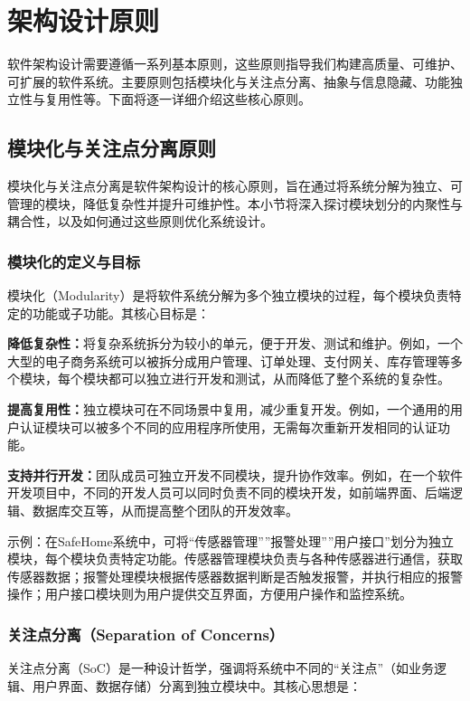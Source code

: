 \section{架构设计原则}

软件架构设计需要遵循一系列基本原则，这些原则指导我们构建高质量、可维护、可扩展的软件系统。主要原则包括模块化与关注点分离、抽象与信息隐藏、功能独立性与复用性等。下面将逐一详细介绍这些核心原则。

\subsection{模块化与关注点分离原则}

模块化与关注点分离是软件架构设计的核心原则，旨在通过将系统分解为独立、可管理的模块，降低复杂性并提升可维护性。本小节将深入探讨模块划分的内聚性与耦合性，以及如何通过这些原则优化系统设计。

\subsubsection{模块化的定义与目标}

模块化（Modularity）是将软件系统分解为多个独立模块的过程，每个模块负责特定的功能或子功能。其核心目标是：

\textbf{降低复杂性：}将复杂系统拆分为较小的单元，便于开发、测试和维护。例如，一个大型的电子商务系统可以被拆分成用户管理、订单处理、支付网关、库存管理等多个模块，每个模块都可以独立进行开发和测试，从而降低了整个系统的复杂性。

\textbf{提高复用性：}独立模块可在不同场景中复用，减少重复开发。例如，一个通用的用户认证模块可以被多个不同的应用程序所使用，无需每次重新开发相同的认证功能。

\textbf{支持并行开发：}团队成员可独立开发不同模块，提升协作效率。例如，在一个软件开发项目中，不同的开发人员可以同时负责不同的模块开发，如前端界面、后端逻辑、数据库交互等，从而提高整个团队的开发效率。

示例：在SafeHome系统中，可将``传感器管理''''报警处理''''用户接口''划分为独立模块，每个模块负责特定功能。传感器管理模块负责与各种传感器进行通信，获取传感器数据；报警处理模块根据传感器数据判断是否触发报警，并执行相应的报警操作；用户接口模块则为用户提供交互界面，方便用户操作和监控系统。

\subsubsection{关注点分离（Separation of Concerns）}

关注点分离（SoC）是一种设计哲学，强调将系统中不同的``关注点''（如业务逻辑、用户界面、数据存储）分离到独立模块中。其核心思想是：

